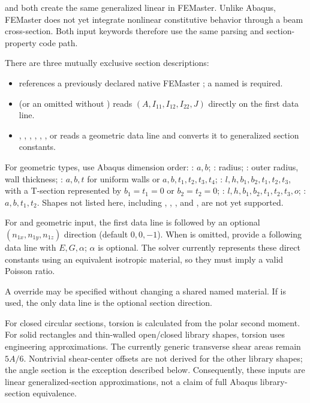 
 and  both create the same generalized linear  in FEMaster. Unlike Abaqus, FEMaster does not yet integrate nonlinear constitutive behavior through a beam cross-section. Both input keywords therefore use the same parsing and section-property code path.

There are three mutually exclusive section descriptions:

\begin{itemize}
  \item {} references a previously declared native FEMaster ; a named  is required.
  \item {} (or an omitted  without ) reads \((A,I_{11},I_{12},I_{22},J)\) directly on the first data line.
  \item {}, , , , , , or  reads a geometric data line and converts it to generalized section constants.
\end{itemize}

For geometric types, use Abaqus dimension order: : \(a,b\); : radius; : outer radius, wall thickness; : \(a,b,t\) for uniform walls or \(a,b,t_1,t_2,t_3,t_4\); : \(l,h,b_1,b_2,t_1,t_2,t_3\), with a T-section represented by \(b_1=t_1=0\) or \(b_2=t_2=0\); : \(l,h,b_1,b_2,t_1,t_2,t_3,o\); : \(a,b,t_1,t_2\). Shapes not listed here, including , , , and , are not yet supported.

For  and geometric input, the first data line is followed by an optional \((n_{1x},n_{1y},n_{1z})\) direction (default \(0,0,-1\)). When  is omitted, provide a following data line with \(E,G,\alpha\); \(\alpha\) is optional. The solver currently represents these direct constants using an equivalent isotropic material, so they must imply a valid Poisson ratio.

A  override may be specified without changing a shared named material. If  is used, the only data line is the optional section direction.

For closed circular sections, torsion is calculated from the polar second moment. For solid rectangles and thin-walled open/closed library shapes, torsion uses engineering approximations. The currently generic transverse shear areas remain \(5A/6\). Nontrivial shear-center offsets are not derived for the other library shapes; the angle section  is the exception described below. Consequently, these inputs are linear generalized-section approximations, not a claim of full Abaqus library-section equivalence.

